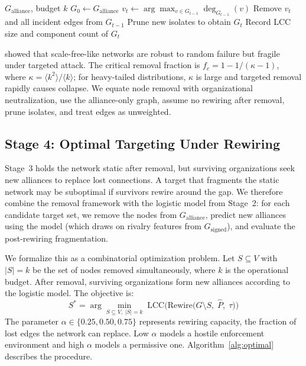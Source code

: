 \documentclass[11pt, a4paper]{article}
\begin{document}
\begin{algorithm}[H]
\caption{Sequential adaptive attack}\label{alg:sequential}
\begin{algorithmic}[1]
\Require $G_{\text{alliance}}$, budget $k$
\State $G_0 \gets G_{\text{alliance}}$
    \State $v_t \gets \arg\max_{v \in G_{t-1}} \deg_{G_{t-1}}(v)$ 
    \State Remove $v_t$ and all incident edges from $G_{t-1}$
    \State Prune new isolates to obtain $G_t$
    \State Record LCC size and component count of $G_t$
\EndFor
\end{algorithmic}
\end{algorithm}

\citet{albert2000error} showed that scale-free-like networks are robust to random failure but fragile under targeted attack. The critical removal fraction is $f_c = 1 - 1/(\kappa - 1)$, where $\kappa = \langle k^2 \rangle / \langle k \rangle$; for heavy-tailed distributions, $\kappa$ is large and targeted removal rapidly causes collapse. We equate node removal with organizational neutralization, use the alliance-only graph, assume no rewiring after removal, prune isolates, and treat edges as unweighted.

\subsection{Stage 4: Optimal Targeting Under Rewiring}\label{sec:stage4_methods}

Stage~3 holds the network static after removal, but surviving organizations seek new alliances to replace lost connections. A target that fragments the static network may be suboptimal if survivors rewire around the gap. We therefore combine the removal framework with the logistic model from Stage~2: for each candidate target set, we remove the nodes from $G_{\text{alliance}}$, predict new alliances using the model (which draws on rivalry features from $G_{\text{signed}}$), and evaluate the post-rewiring fragmentation.

We formalize this as a combinatorial optimization problem. Let $S \subseteq V$ with $|S| = k$ be the set of nodes removed simultaneously, where $k$ is the operational budget. After removal, surviving organizations form new alliances according to the logistic model. The objective is:
\begin{equation}\label{eq:optimal}
    S^* = \arg\min_{S \subseteq V,\; |S| = k} \; \text{LCC}\Big(\text{Rewire}\big(G \setminus S,\; \hat{P},\; \tau\big)\Big)
\end{equation}
The parameter $\alpha \in \{0.25, 0.50, 0.75\}$ represents rewiring capacity, the fraction of lost edges the network can replace. Low $\alpha$ models a hostile enforcement environment and high $\alpha$ models a permissive one. Algorithm~\ref{alg:optimal} describes the procedure.
\end{document}

